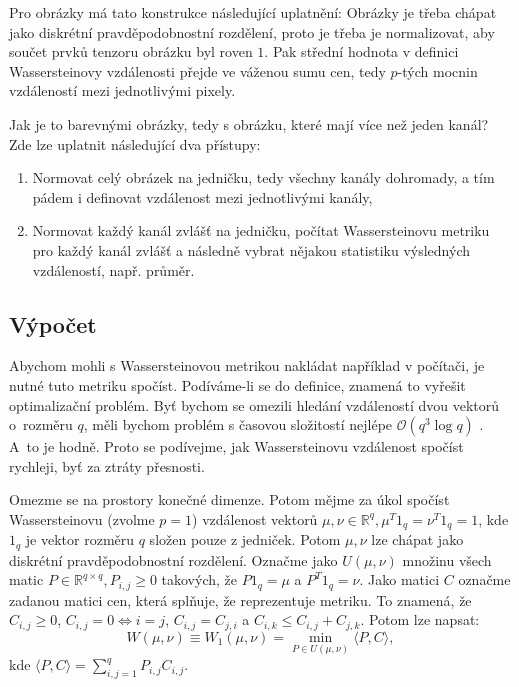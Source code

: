 \documentclass[czech]{article}
\begin{document}
Pro obrázky má tato konstrukce následující uplatnění:
Obrázky je třeba chápat jako diskrétní pravděpodobnostní rozdělení,
proto je třeba je normalizovat,
aby součet prvků tenzoru obrázku byl roven $1$.
Pak střední hodnota v definici Wassersteinovy vzdálenosti přejde ve váženou sumu cen,
tedy $p$-tých mocnin vzdáleností mezi jednotlivými pixely.

Jak je to barevnými obrázky, tedy s obrázku, které mají více než jeden kanál?
Zde lze uplatnit následující dva přístupy:
\begin{enumerate}
    \item Normovat celý obrázek na jedničku, tedy všechny kanály dohromady, a tím pádem i definovat vzdálenost mezi jednotlivými kanály,
    \item Normovat každý kanál zvlášť na jedničku, počítat Wassersteinovu metriku pro každý kanál zvlášť
    a následně vybrat nějakou statistiku výsledných vzdáleností, např. průměr.
\end{enumerate}

\subsection{Výpočet}

Abychom mohli s Wassersteinovou metrikou nakládat například v počítači, je nutné tuto metriku spočíst.
Podíváme-li se do definice, znamená to vyřešit optimalizační problém.
Byť bychom se omezili hledání vzdáleností dvou vektorů o~rozměru $q$,
měli bychom problém s časovou složitostí nejlépe $\mathcal{O}(q^3 \operatorname{log} q)$ \cite{wass_computation}.
A~to je hodně.
Proto se podívejme, jak Wassersteinovu vzdálenost spočíst rychleji, byť za ztráty přesnosti.

Omezme se na prostory konečné dimenze. Potom mějme za úkol spočíst Wassersteinovu  (zvolme $p = 1$) vzdálenost vektorů
$\mu, \nu \in \mathbb{R}^q, \mu ^ T 1_q = \nu ^ T 1_q = 1$, kde $1_q$ je vektor rozměru $q$ složen pouze z jedniček.
Potom $\mu, \nu$ lze chápat jako diskrétní pravděpodobnostní rozdělení.
Označme jako $U(\mu, \nu)$ množinu všech matic $P \in \mathbb{R}^{q \times q}, P_{i,j} \geq 0$
takových, že $P 1_q = \mu$ a $P^T 1_q = \nu$.
Jako matici $C$ označme zadanou matici cen, která splňuje, že reprezentuje metriku.
To znamená, že $C_{i, j} \geq 0$, $C_{i, j} = 0 \iff i = j$, $C_{i, j} = C_{j, i}$ a $C_{i, k} \leq C_{i, j} + C_{j, k}$.
Potom lze napsat:
\begin{equation}
    W (\mu, \nu) \equiv W_1 (\mu, \nu) = \min_{P \in U(\mu, \nu)} \langle P, C \rangle,
\end{equation}
kde $\langle P, C \rangle = \sum_{i, j = 1}^q P_{i, j} C_{i, j}$.
\end{document}

